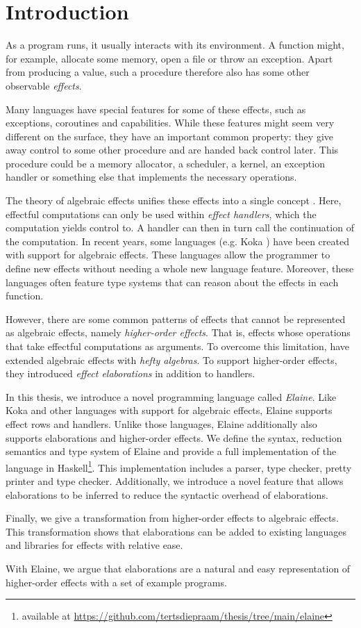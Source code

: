 \chapter{Introduction}\label{chap:introduction}

As a program runs, it usually interacts with its environment. A function might, for example, allocate some memory, open a file or throw an exception. Apart from producing a value, such a procedure therefore also has some other observable \emph{effects}.

Many languages have special features for some of these effects, such as exceptions, coroutines and capabilities. While these features might seem very different on the surface, they have an important common property: they give away control to some other procedure and are handed back control later. This procedure could be a memory allocator, a scheduler, a kernel, an exception handler or something else that implements the necessary operations.

The theory of algebraic effects unifies these effects into a single concept \autocite{goos_adequacy_2001, castagna_handlers_2009}. Here, effectful computations can only be used within \emph{effect handlers}, which the computation yields control to. A handler can then in turn call the continuation of the computation. In recent years, some languages (e.g. Koka \autocite{leijen_type_2017}) have been created with support for algebraic effects. These languages allow the programmer to define new effects without needing a whole new language feature. Moreover, these languages often feature type systems that can reason about the effects in each function.

However, there are some common patterns of effects that cannot be represented as algebraic effects, namely \emph{higher-order effects}. That is, effects whose operations that take effectful computations as arguments. To overcome this limitation, \textcite{bach_poulsen_hefty_2023} have extended algebraic effects with \emph{hefty algebras}. To support higher-order effects, they introduced \emph{effect elaborations} in addition to handlers.

In this thesis, we introduce a novel programming language called \emph{Elaine}. Like Koka and other languages with support for algebraic effects, Elaine supports effect rows and handlers. Unlike those languages, Elaine additionally also supports elaborations and higher-order effects. We define the syntax, reduction semantics and type system of Elaine and provide a full implementation of the language in Haskell\footnote{available at \url{https://github.com/tertsdiepraam/thesis/tree/main/elaine}}. This implementation includes a parser, type checker, pretty printer and type checker. Additionally, we introduce a novel feature that allows elaborations to be inferred to reduce the syntactic overhead of elaborations.

Finally, we give a transformation from higher-order effects to algebraic effects. This transformation shows that elaborations can be added to existing languages and libraries for effects with relative ease.

With Elaine, we argue that elaborations are a natural and easy representation of higher-order effects with a set of example programs.
